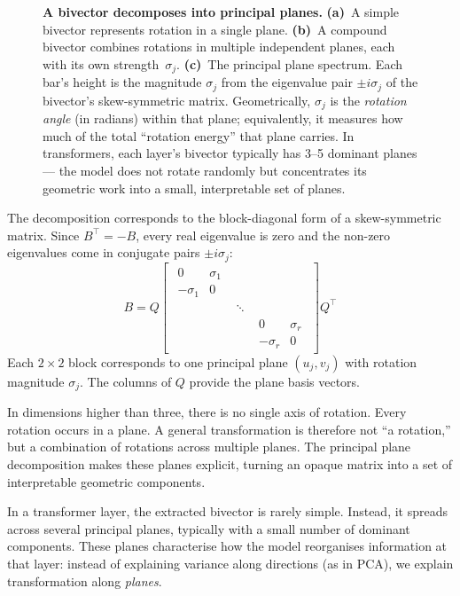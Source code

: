 \documentclass[11pt, twoside, openright]{memoir}
\numberwithin{equation}{chapter}
\begin{document}
\begin{figure}[ht]
\caption{\textbf{A bivector decomposes into principal planes.}
\textbf{(a)}~A simple bivector represents rotation in a single plane.
\textbf{(b)}~A compound bivector combines rotations in multiple
independent planes, each with its own strength~$\sigma_j$.
\textbf{(c)}~The principal plane spectrum.  Each bar's height is the
magnitude $\sigma_j$ from the eigenvalue pair $\pm i\sigma_j$ of the
bivector's skew-symmetric matrix.  Geometrically, $\sigma_j$ is the
\emph{rotation angle} (in radians) within that plane; equivalently, it
measures how much of the total ``rotation energy'' that plane carries.
In transformers, each layer's bivector typically has 3--5 dominant
planes --- the model does not rotate randomly but concentrates its
geometric work into a small, interpretable set of planes.}
\label{fig:principal-planes}
\end{figure}

The decomposition corresponds to the block-diagonal form of a
skew-symmetric matrix.  Since $B^\top = -B$, every real eigenvalue
is zero and the non-zero eigenvalues come in conjugate pairs
$\pm i\sigma_j$:
\begin{equation}
  B = Q
  \begin{bmatrix}
  \begin{smallmatrix}
    0 & \sigma_1 \\
    -\sigma_1 & 0
  \end{smallmatrix}
  & & \\
  & \ddots & \\
  & &
  \begin{smallmatrix}
    0 & \sigma_r \\
    -\sigma_r & 0
  \end{smallmatrix}
  \end{bmatrix}
  Q^\top
\end{equation}
Each $2 \times 2$ block corresponds to one principal plane $(u_j, v_j)$
with rotation magnitude $\sigma_j$.  The columns of $Q$ provide the
plane basis vectors.

In dimensions higher than three, there is no single axis of rotation.
Every rotation occurs in a plane.  A general transformation is therefore
not ``a rotation,'' but a combination of rotations across multiple planes.
The principal plane decomposition makes these planes explicit, turning an
opaque matrix into a set of interpretable geometric components.

\begin{transformer}
In a transformer layer, the extracted bivector is rarely simple.
Instead, it spreads across several principal planes, typically with a
small number of dominant components.  These planes characterise how the
model reorganises information at that layer: instead of explaining
variance along directions (as in PCA), we explain transformation
along \emph{planes}.
\end{transformer}
\end{document}
